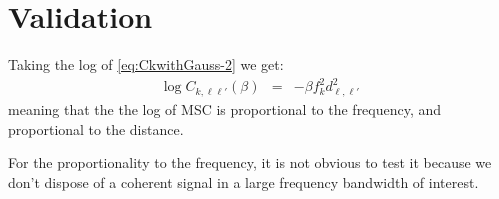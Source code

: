 \documentclass[a4paper, 12pt]{report}
\begin{document}
 \section{Validation}
Taking the log of \eqref{eq:CkwithGauss-2} we get:
\begin{eqnarray}
 \label{eq:logCkwithcauchy}
 \log C_{k,\ell\ell'} (\beta)&=& -\beta f_k^2 d_{\ell,\ell'}^2
\end{eqnarray}
meaning that the the log of MSC is proportional to the frequency, and proportional to the distance. 

For the proportionality to the frequency, it is not obvious to test it because we don't dispose of a coherent signal in a large frequency bandwidth of interest. 


\end{document}

